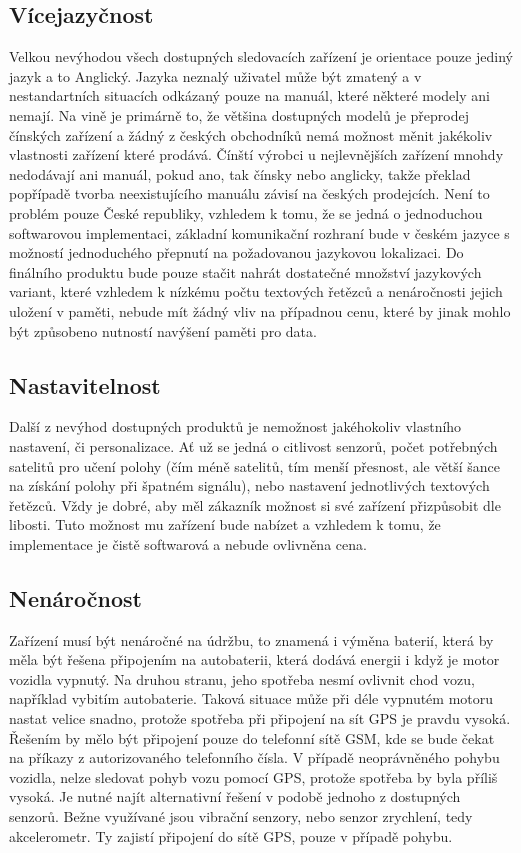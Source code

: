 \documentclass[FM,BP]{tulthesis}
\begin{document}
\subsection{Vícejazyčnost}
Velkou nevýhodou všech dostupných sledovacích zařízení je orientace pouze jediný jazyk a to Anglický. Jazyka neznalý uživatel může být zmatený a v nestandartních situacích odkázaný pouze na manuál, které některé modely ani nemají. Na vině je primárně to, že většina dostupných modelů je přeprodej čínských zařízení a žádný z českých obchodníků nemá možnost měnit jakékoliv vlastnosti zařízení které prodává. Čínští výrobci u nejlevnějších zařízení mnohdy nedodávají ani manuál, pokud ano, tak čínsky nebo anglicky, takže překlad popřípadě tvorba neexistujícího manuálu závisí na českých prodejcích. Není to problém pouze České republiky, vzhledem k tomu, že se jedná o jednoduchou softwarovou implementaci, základní komunikační rozhraní bude v českém jazyce s možností jednoduchého přepnutí na požadovanou jazykovou lokalizaci. Do finálního produktu bude pouze stačit nahrát dostatečné množství jazykových variant, které vzhledem k nízkému počtu textových řetězců a nenáročnosti jejich uložení v paměti, nebude mít žádný vliv na případnou cenu, které by jinak mohlo být způsobeno nutností navýšení paměti pro data.

\subsection{Nastavitelnost}
Další z nevýhod dostupných produktů je nemožnost jakéhokoliv vlastního nastavení, či personalizace. Ať už se jedná o citlivost senzorů, počet potřebných satelitů pro učení polohy (čím méně satelitů, tím menší přesnost, ale větší šance na získání polohy při špatném signálu), nebo nastavení jednotlivých textových řetězců. Vždy je dobré, aby měl zákazník možnost si své zařízení přizpůsobit dle libosti. Tuto možnost mu zařízení bude nabízet a vzhledem k tomu, že implementace je čistě softwarová a nebude ovlivněna cena.

\subsection{Nenáročnost}
Zařízení musí být nenáročné na údržbu, to znamená i výměna baterií, která by měla být řešena připojením na autobaterii, která dodává energii i když je motor vozidla vypnutý. Na druhou stranu, jeho spotřeba nesmí ovlivnit chod vozu, například vybitím autobaterie. Taková situace může při déle vypnutém motoru nastat velice snadno, protože spotřeba při připojení na sít GPS je pravdu vysoká. Řešením by mělo být připojení pouze do telefonní sítě GSM, kde se bude čekat na příkazy z autorizovaného telefonního čísla. V případě neoprávněného pohybu vozidla, nelze sledovat pohyb vozu pomocí GPS, protože spotřeba by byla příliš vysoká. Je nutné najít alternativní řešení v podobě jednoho z dostupných senzorů. Bežne využívané jsou vibrační senzory, nebo senzor zrychlení, tedy akcelerometr. Ty zajistí připojení do sítě GPS, pouze v případě pohybu.
\end{document}
